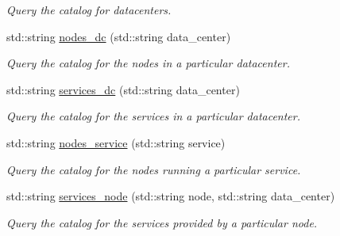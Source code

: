 \begin{DoxyCompactItemize}
\begin{DoxyCompactList}\small\item\em Query the catalog for datacenters. \end{DoxyCompactList}\item 
\hypertarget{classConsulAdmin_a20888c98619dc9bed63ecda78085fd4a}{std\-::string \hyperlink{classConsulAdmin_a20888c98619dc9bed63ecda78085fd4a}{nodes\-\_\-dc} (std\-::string data\-\_\-center)}\label{classConsulAdmin_a20888c98619dc9bed63ecda78085fd4a}

\begin{DoxyCompactList}\small\item\em Query the catalog for the nodes in a particular datacenter. \end{DoxyCompactList}\item 
\hypertarget{classConsulAdmin_aaac11b600131ef18b5d88d51102a8007}{std\-::string \hyperlink{classConsulAdmin_aaac11b600131ef18b5d88d51102a8007}{services\-\_\-dc} (std\-::string data\-\_\-center)}\label{classConsulAdmin_aaac11b600131ef18b5d88d51102a8007}

\begin{DoxyCompactList}\small\item\em Query the catalog for the services in a particular datacenter. \end{DoxyCompactList}\item 
\hypertarget{classConsulAdmin_ad667e4ff5102614a50a0e719eccd1ea4}{std\-::string \hyperlink{classConsulAdmin_ad667e4ff5102614a50a0e719eccd1ea4}{nodes\-\_\-service} (std\-::string service)}\label{classConsulAdmin_ad667e4ff5102614a50a0e719eccd1ea4}

\begin{DoxyCompactList}\small\item\em Query the catalog for the nodes running a particular service. \end{DoxyCompactList}\item 
\hypertarget{classConsulAdmin_a42bf71278508f190a7eeb345c9c692e1}{std\-::string \hyperlink{classConsulAdmin_a42bf71278508f190a7eeb345c9c692e1}{services\-\_\-node} (std\-::string node, std\-::string data\-\_\-center)}\label{classConsulAdmin_a42bf71278508f190a7eeb345c9c692e1}

\begin{DoxyCompactList}\small\item\em Query the catalog for the services provided by a particular node. \end{DoxyCompactList}\end{DoxyCompactItemize}


